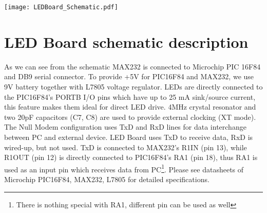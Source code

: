 \documentclass{article}
\begin{document}
\begin{center}
\texttt{[image: LEDBoard\_Schematic.pdf]}
\end{center}

\newpage

\section{LED Board schematic description}
As we can see from the schematic MAX232 is connected to Microchip
PIC 16F84 and DB9 serial connector. To provide +5V for PIC16F84 and
MAX232, we use 9V battery together with L7805 voltage regulator.
LEDs are directly connected to the PIC16F84's PORTB I/O pins which
have up to 25 mA sink/source current, this feature makes them ideal
for direct LED drive. 4MHz crystal resonator and two 20pF capacitors
(C7, C8) are used to provide external clocking (XT mode). The Null
Modem configuration uses TxD and RxD lines for data interchange
between PC and external device. LED Board uses TxD to receive data,
RxD is wired-up, but not used. TxD is connected to MAX232's R1IN
(pin 13), while R1OUT (pin 12) is directly connected to PIC16F84's
RA1 (pin 18), thus RA1 is used as an input pin which receives data
from PC\footnote{There is nothing special with RA1, different pin
can be used as well}. Please see datasheets of Microchip PIC16F84,
MAX232, L7805 for detailed specifications.
\end{document}
